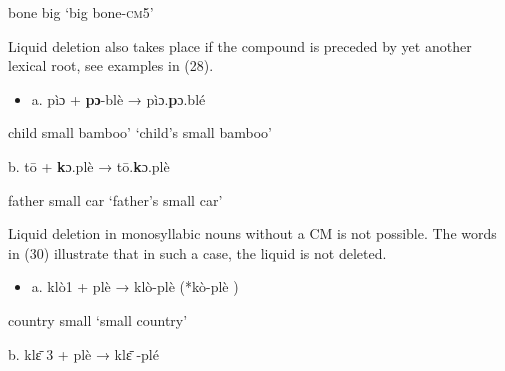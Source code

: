 \begin{styleindexi}
                  bone                big                                    ‘big bone-\textsc{cm}5’
\end{styleindexi}

Liquid deletion also takes place if the compound is preceded by yet another lexical root, see examples in (28).

\begin{itemize}
\item \begin{styleindexi}
     a.   pìɔ              +      \textbf{pɔ}{}-blè                    →          pìɔ.\textbf{p}ɔ.blé                     
\end{styleindexi}\end{itemize}
\begin{styleindexi}
                child                small bamboo’                      ‘child’s small bamboo’
\end{styleindexi}

\begin{styleindexi}
            b.   tō               +        \textbf{k}ɔ.plè    \-                 →          tō.\textbf{k}ɔ.plè 
\end{styleindexi}

\begin{styleindexi}
                father               small car                             ‘father’s small car’  
\end{styleindexi}

Liquid deletion in monosyllabic nouns without a CM is not possible. The words in (30) illustrate that in such a case, the liquid is not deleted.        

\begin{itemize}
\item \begin{styleindexi}
\label{bkm:Ref500050155}    a.    klò1            +      plè                           →          klò-plè                  (*kò-plè  )
\end{styleindexi}\end{itemize}
\begin{styleindexi}
                country            small                                  ‘small country’                 
\end{styleindexi}

\begin{styleindexi}
            b.   klɛ\={} 3              +      plè                        →          klɛ\={} -plé   
\end{styleindexi}

